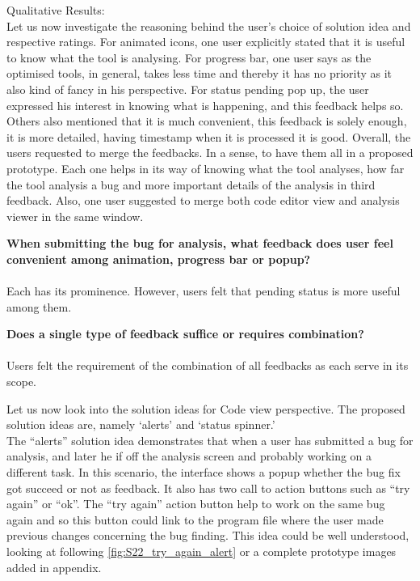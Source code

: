 Qualitative Results: \\

Let us now investigate the reasoning behind the user’s choice of solution idea and respective ratings. For animated icons, one user explicitly stated that it is useful to know what the tool is analysing. For progress bar, one user says as the optimised tools, in general, takes less time and thereby it has no priority as it also kind of fancy in his perspective. For status pending pop up, the user expressed his interest in knowing what is happening, and this feedback helps so. Others also mentioned that it is much convenient,  this feedback is solely enough, it is more detailed, having timestamp when it is processed it is good. Overall, the users requested to merge the feedbacks. In a sense, to have them all in a proposed prototype. Each one helps in its way of knowing what the tool analyses, how far the tool analysis a bug and more important details of the analysis in third feedback. Also, one user suggested to merge both code editor view and analysis viewer in the same window. \\

\begin{myboxi}{{\textbf{When submitting the bug for analysis, what feedback does user feel convenient among animation, progress bar or popup?}}}
\\ \\	Each has its prominence. However, users felt that pending status is more useful among them.
\end{myboxi}

\begin{myboxi}{{\textbf{Does a single type of feedback suffice or requires combination?}}}
\\ \\	Users felt the requirement of the combination of all feedbacks as each serve in its scope.
\end{myboxi}

Let us now look into the solution ideas for Code view perspective. The proposed solution ideas are, namely ‘alerts’ and ‘status spinner.’ \\


The “alerts” solution idea demonstrates that when a user has submitted a bug for analysis, and later he if off the analysis screen and probably working on a different task. In this scenario,  the interface shows a popup whether the bug fix got succeed or not as feedback. It also has two call to action buttons such as “try again” or “ok”. The “try again” action button help to work on the same bug again and so this button could link to the program file where the user made previous changes concerning the bug finding. This idea could be well understood, looking at following \autoref{fig:S22_try_again_alert} or a complete prototype images added in appendix. \\


